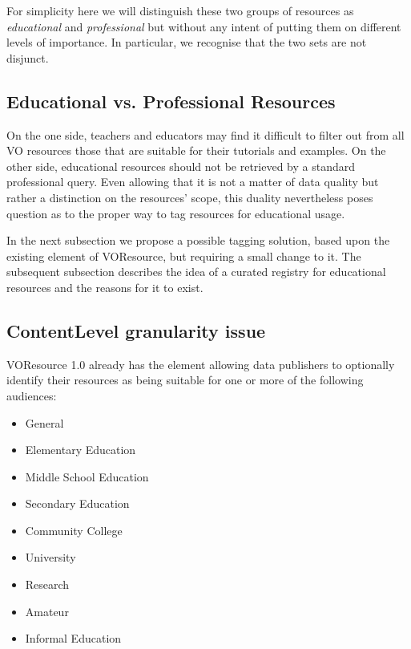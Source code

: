 \documentclass{ivoa}
\begin{document}
For simplicity here we will distinguish these two groups of resources as
\emph{educational}
 and 
\emph{professional}
 but without any intent of putting them
on different levels of importance.  In particular, we recognise that the
two sets are not disjunct.



\subsection{Educational vs. Professional Resources}

\label{sect:eduvspro}


On the one side, teachers and educators may find it difficult to filter out 
from all VO resources those that are suitable for their tutorials and
examples. On the other side, educational resources should not be retrieved 
by a standard professional query.
Even allowing that it is not a matter of data quality but rather a distinction on 
the resources' scope, this duality nevertheless poses question as to the
proper way to tag resources for educational usage.
  


In the next subsection we propose a possible tagging solution, based upon 
the existing 
element of VOResource, but requiring a small change
to it. The subsequent subsection describes the idea of a
curated registry for educational resources and the reasons for it to exist.
  


\subsection{ContentLevel granularity issue}

\label{sect:contentlvl}

VOResource 1.0 already has the 
element
allowing data publishers to optionally identify their resources as being 
suitable for one or more of the following audiences:


\begin{itemize}

\item General{}

\item Elementary Education{}

\item Middle School Education{}

\item Secondary Education{}

\item Community College{}

\item University{}

\item Research{}

\item Amateur{}

\item Informal Education{}

\end{itemize}
\end{document}
